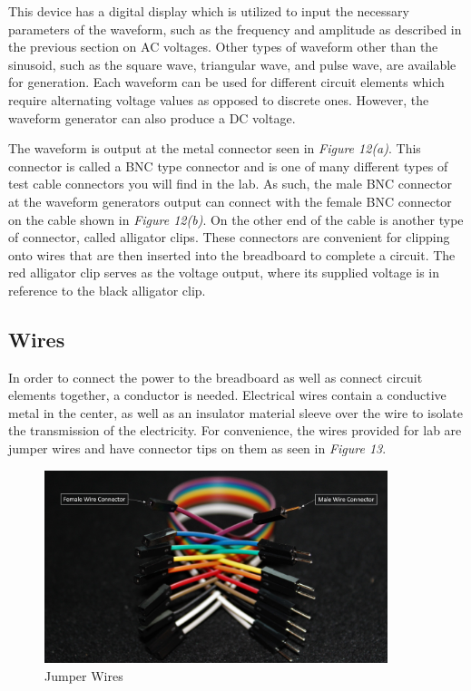 \documentclass[12pt]{article}
\begin{document}
This device has a digital display which is utilized to input the necessary parameters of the waveform, such as the frequency and amplitude as described in the previous section on AC voltages. Other types of waveform other than the sinusoid, such as the square wave, triangular wave, and pulse wave, are available for generation. Each waveform can be used for different circuit elements which require alternating voltage values as opposed to discrete ones. However, the waveform generator can also produce a DC voltage.

The waveform is output at the metal connector seen in \textit{Figure 12(a)}. This connector is called a BNC type connector and is one of many different types of test cable connectors you will find in the lab. As such, the male BNC connector at the waveform generators output can connect with the female BNC connector on the cable shown in \textit{Figure 12(b)}. On the other end of the cable is another type of connector, called alligator clips. These connectors are convenient for clipping onto wires that are then inserted into the breadboard to complete a circuit. The red alligator clip serves as the voltage output, where its supplied voltage is in reference to the black alligator clip.

\subsection{Wires}

In order to connect the power to the breadboard as well as connect circuit elements together, a conductor is needed. Electrical wires contain a conductive metal in the center, as well as an insulator material sleeve over the wire to isolate the transmission of the electricity. For convenience, the wires provided for lab are jumper wires and have connector tips on them as seen in \textit{Figure 13}. 

\begin{figure}[H]
    \centering
    \includegraphics[width=10cm]{photos/prelim/wire.png}
    \caption{Jumper Wires}
\end{figure}
\end{document}
